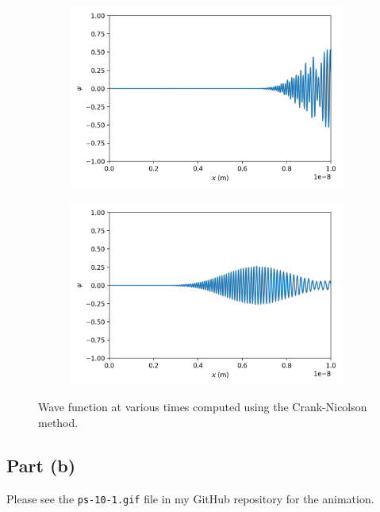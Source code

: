 \documentclass[11pt]{article}
\begin{document}
\begin{figure}[H]
    \begin{subfigure}[H]{0.48\textwidth}
        \centering
        \includegraphics[width=\textwidth]{Figs/ps-10-1-2.png}
    \end{subfigure}
    \hfill
    \begin{subfigure}[H]{0.48\textwidth}
        \centering
        \includegraphics[width=\textwidth]{Figs/ps-10-1-3.png}
    \end{subfigure}
    \caption{Wave function at various times computed using the Crank-Nicolson method.}
    \label{fig:CN}
\end{figure}

\subsection{Part (b)}
Please see the \texttt{ps-10-1.gif} file in my GitHub repository for the animation.
\end{document}
